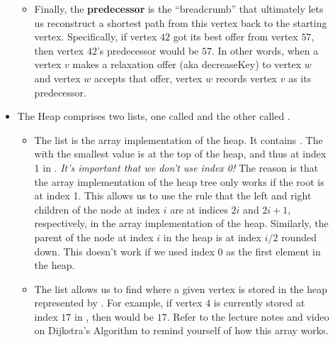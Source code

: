 \documentclass{ks-pset}
\begin{document}
\begin{problem}[\Py{PrimDijkstra}, 65]
\begin{description}
\begin{itemize}
\begin{itemize}
            \item Finally, the \textbf{predecessor} is the ``breadcrumb'' that
              ultimately lets us reconstruct a shortest path from this vertex
              back to the starting vertex. Specifically, if vertex \(42\) got
              its best offer from vertex \(57\), then vertex \(42\)'s
              predecessor would be \(57\). In other words, when a vertex \(v\)
              makes a relaxation offer (aka decreaseKey) to vertex \(w\) and
              vertex \(w\) accepts that offer, vertex \(w\) records vertex
              \(v\) as its predecessor.

          \end{itemize}

        \item The Heap comprises two lists, one called  and the
          other called .

          \begin{itemize}

            \item The list  is the array implementation of the
              heap. It contains . The  with the smallest
              value is at the top of the heap, and thus at index 1 in
              .  \emph{It's important that we don't use index
              0!} The reason is that the array implementation of the heap tree
              only works if the root is at index 1. This allows us to use the
              rule that the left and right children of the node at index \(i\)
              are at indices \(2i\) and \(2i+1\), respectively, in the array
              implementation of the heap. Similarly, the parent of the node at
              index \(i\) in the heap is at index \(i/2\) rounded down. This
              doesn't work if we used index \(0\) as the first element in the
              heap.

            \item The list  allows us to find where a given
              vertex is stored in the heap represented by . For
              example, if vertex \(4\) is currently stored at index \(17\) in
              , then  would be \(17\). Refer
              to the lecture notes and video on Dijkstra's Algorithm to remind
              yourself of how this array works.

          \end{itemize}


\end{itemize}
\end{description}
\end{problem}
\end{document}
